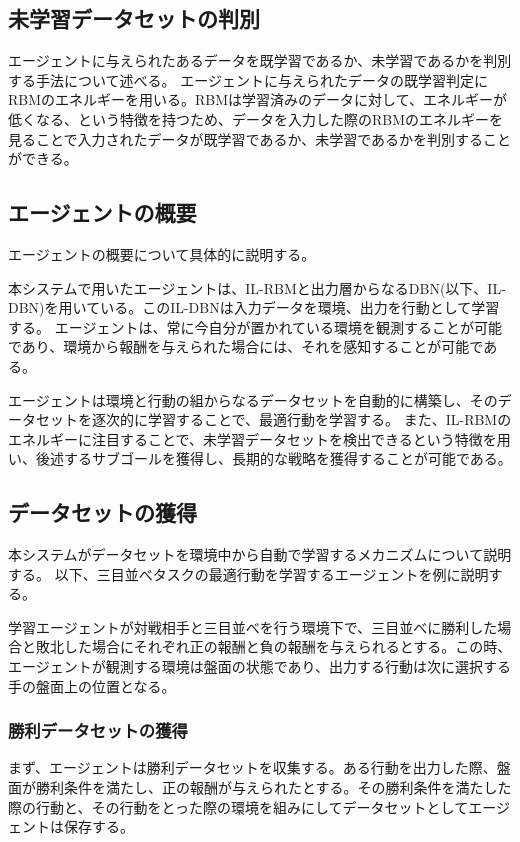 \subsection{未学習データセットの判別}
エージェントに与えられたあるデータを既学習であるか、未学習であるかを判別する手法について述べる。
エージェントに与えられたデータの既学習判定にRBMのエネルギーを用いる。RBMは学習済みのデータに対して、エネルギーが低くなる、という特徴を持つため、データを入力した際のRBMのエネルギーを見ることで入力されたデータが既学習であるか、未学習であるかを判別することができる。


\subsection{エージェントの概要}
エージェントの概要について具体的に説明する。

本システムで用いたエージェントは、IL-RBMと出力層からなるDBN(以下、IL-DBN)を用いている。このIL-DBNは入力データを環境、出力を行動として学習する。
エージェントは、常に今自分が置かれている環境を観測することが可能であり、環境から報酬を与えられた場合には、それを感知することが可能である。

エージェントは環境と行動の組からなるデータセットを自動的に構築し、そのデータセットを逐次的に学習することで、最適行動を学習する。
また、IL-RBMのエネルギーに注目することで、未学習データセットを検出できるという特徴を用い、後述するサブゴールを獲得し、長期的な戦略を獲得することが可能である。


\subsection{データセットの獲得}

本システムがデータセットを環境中から自動で学習するメカニズムについて説明する。
以下、三目並べタスクの最適行動を学習するエージェントを例に説明する。

学習エージェントが対戦相手と三目並べを行う環境下で、三目並べに勝利した場合と敗北した場合にそれぞれ正の報酬と負の報酬を与えられるとする。この時、エージェントが観測する環境は盤面の状態であり、出力する行動は次に選択する手の盤面上の位置となる。

\subsubsection{勝利データセットの獲得}
まず、エージェントは勝利データセットを収集する。ある行動を出力した際、盤面が勝利条件を満たし、正の報酬が与えられたとする。その勝利条件を満たした際の行動と、その行動をとった際の環境を組みにしてデータセットとしてエージェントは保存する。

